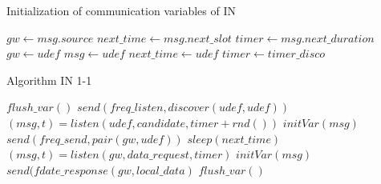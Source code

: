 \documentclass[conference]{IEEEtran}
\begin{document}
\begin{algorithm}[!h]
\caption{Initialization of communication variables of IN}\label{alg:intvar}
\begin{algorithmic}[1]
\State $gw \leftarrow msg.source$
\State $next\_time \leftarrow msg.next\_slot$
\State $timer \leftarrow msg.next\_duration$
\EndProcedure
\State
{}
\State $gw \leftarrow udef$
\State $msg \leftarrow udef$
\State $next\_time \leftarrow udef$
\State $timer \leftarrow timer\_disco$
\EndProcedure
\end{algorithmic}
\end{algorithm}



\begin{algorithm}
\caption{Algorithm IN 1-1}\label{alg:in1-1}
\begin{algorithmic}[1]
  \State $flush\_var()$
    \State $send(freq\_listen,discover(udef,udef))$
    \State $(msg,t) = listen(udef,candidate,timer +rnd())$
  \EndWhile
  \State $initVar(msg)$
  \State $send(freq\_send,pair(gw,udef))$
  \State
    \State $sleep(next\_time)$
    \State $(msg,t) = listen(gw,data\_request,timer)$
      \State $initVar(msg)$
      \State $send(fdate\_response(gw,local\_data)$
    \Else
      $flush\_var()$
    \EndIf
  \EndWhile
\EndWhile
\end{algorithmic}
\end{algorithm}
\end{document}
